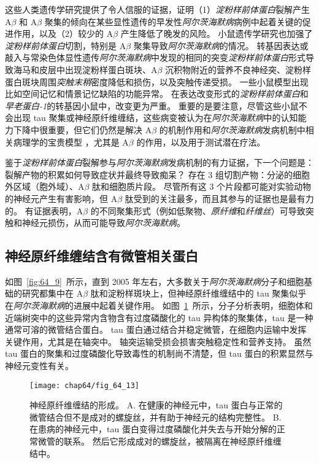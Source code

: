 这些人类遗传学研究提供了令人信服的证据，证明（1）\textit{淀粉样前体蛋白}裂解产生 A$\beta$ 和 A$\beta$ 聚集的倾向在某些显性遗传的早发性\textit{阿尔茨海默病}病例中起着关键的促进作用，以及（2）较少的 A$\beta$ 产生降低了晚发的风险。
小鼠遗传学研究也加强了\textit{淀粉样前体蛋白}切割，特别是 A$\beta$ 聚集导致\textit{阿尔茨海默病}的情况。
转基因表达或敲入与常染色体显性遗传\textit{阿尔茨海默病}中发现的相同的突变\textit{淀粉样前体蛋白}形式导致海马和皮层中出现淀粉样蛋白斑块、A$\beta$ 沉积物附近的营养不良神经突、淀粉样蛋白斑块周围\textit{突触末稍}密度降低和损伤，以及突触传递受损。
一些小鼠模型出现比如空间记忆和情景记忆缺陷的功能异常。
在表达改变形式的\textit{淀粉样前体蛋白}和\textit{早老蛋白-1}的转基因小鼠中，改变更为严重。
重要的是要注意，尽管这些小鼠不会出现 tau 聚集或神经原纤维缠结，这些病变被认为在\textit{阿尔茨海默病}中的认知能力下降中很重要，但它们仍然是解决 A$\beta$ 的机制作用和\textit{阿尔茨海默病}发病机制中相关病理学的宝贵模型 ，尤其是 A$\beta$ 的作用，以及用于测试潜在疗法。


鉴于\textit{淀粉样前体蛋白}裂解参与\textit{阿尔茨海默病}发病机制的有力证据，下一个问题是：
裂解产物的积累如何导致症状并最终导致痴呆？
存在 3 组切割产物：分泌的细胞外区域（胞外域）、A$\beta$ 肽和细胞质片段。
尽管所有这 3 个片段都可能对实验动物的神经元产生有害影响，但 A$\beta$ 肽受到的关注最多，而且其参与的证据也是最有力的。
有证据表明，A$\beta$ 的不同聚集形式（例如低聚物、\textit{原纤维}和\textit{纤维丝}）可导致突触和神经元损伤，从而可能导致\textit{阿尔茨海默病}。



\subsection{神经原纤维缠结含有微管相关蛋白}

如图~\ref{fig:64_9}~所示，直到 2005 年左右，大多数关于\textit{阿尔茨海默病}分子和细胞基础的研究都集中在 A$\beta$ 肽和淀粉样斑块上，但神经原纤维缠结中的 tau 聚集似乎在\textit{阿尔茨海默病}的进展中起着关键作用。
如图~\ref{fig:64_13}~所示，分子分析表明，细胞体和近端树突中的这些异常内含物含有过度磷酸化的 tau 异构体的聚集体，tau 是一种通常可溶的微管结合蛋白。
tau 蛋白通过结合并稳定微管，在细胞内运输中发挥关键作用，尤其是在轴突中。
轴突运输受损会损害突触稳定性和营养支持。
虽然 tau 蛋白的聚集和过度磷酸化导致毒性的机制尚不清楚，但 tau 蛋白的积累显然与神经元变性有关。


\begin{figure}[htbp]
	\centering
	\texttt{[image: chap64/fig\_64\_13]}
	\caption{神经原纤维缠结的形成。
		A. 在健康的神经元中，tau 蛋白与正常的微管结合但不是成对的螺旋丝，并有助于神经元的结构完整性。
		B. 在患病的神经元中，tau 蛋白变得过度磷酸化并失去与开始分解的正常微管的联系。
		然后它形成成对的螺旋丝，被隔离在神经原纤维缠结中。}
	\label{fig:64_13}
\end{figure}


